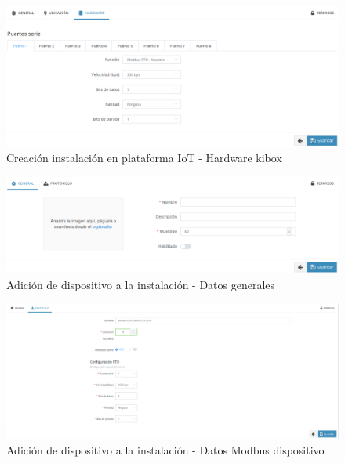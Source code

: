 \vspace*{\fill}

\begin{figure}[H]
  \centering
  \includegraphics[width=\textwidth, keepaspectratio]{img/creacionInstalacionHardware}
  \caption{Creación instalación en plataforma IoT - Hardware kibox}
  \label{figura:creacionInstalacion2}
\end{figure}

\vspace*{\fill}

\begin{figure}[H]
  \centering
  \includegraphics[width=\textwidth, keepaspectratio]{img/creacionDispositivoGeneral}
  \caption{Adición de dispositivo a la instalación - Datos generales}
  \label{figura:adicionDispositivo1}
\end{figure}

\vspace*{\fill}

\begin{figure}[H]
  \centering
  \includegraphics[width=\textwidth, keepaspectratio]{img/creacionDispositivoProtocolo}
  \caption{Adición de dispositivo a la instalación - Datos Modbus dispositivo}
  \label{figura:adicionDispositivo2}
\end{figure}

